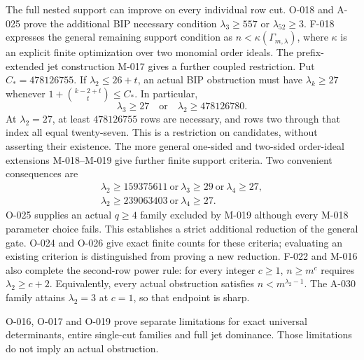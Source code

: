 \documentclass[11pt]{article}
\begin{document}
The full nested support can improve on every individual row cut.
O-018 and A-025 prove the additional BIP necessary condition
\(\lambda_3\geq557\) or \(\lambda_{52}\geq3\).
F-018 expresses the general remaining support condition as
\(n<\kappa(\Gamma_{m,\lambda})\), where \(\kappa\) is an
explicit finite optimization over two monomial order ideals.
The prefix-extended jet construction M-017 gives a further
coupled restriction. Put \(C_*=478126755\). If
\(\lambda_2\leq26+t\), an actual BIP obstruction must have
\(\lambda_k\geq27\) whenever
\(1+\binom{k-2+t}{t}\leq C_*\). In particular,
\[
 \lambda_3\geq27\quad\text{or}\quad\lambda_2\geq478126780.
\]
At \(\lambda_2=27\), at least \(478126755\) rows are
necessary, and rows two through that index all equal twenty-seven.
This is a restriction on candidates, without asserting their existence.
The more general one-sided and two-sided order-ideal extensions
M-018--M-019 give further finite support criteria. Two convenient
consequences are
\[
 \begin{gathered}
 \lambda_2\geq159375611\ \text{or}\ \lambda_3\geq29
                         \ \text{or}\ \lambda_4\geq27,\\
 \lambda_2\geq239063403\ \text{or}\ \lambda_4\geq27.
 \end{gathered}
\]
O-025 supplies an actual \(q\geq4\) family excluded by M-019
although every M-018 parameter choice fails. This establishes a
strict additional reduction of the general gate. O-024 and O-026
give exact finite counts for these criteria; evaluating an existing
criterion is distinguished from proving a new reduction.
F-022 and M-016 also complete the second-row power rule:
for every integer \(c\geq1\), \(n\geq m^c\) requires
\(\lambda_2\geq c+2\). Equivalently, every actual obstruction
satisfies \(n<m^{\lambda_2-1}\).
The A-030 family attains \(\lambda_2=3\) at \(c=1\),
so that endpoint is sharp.

O-016, O-017 and O-019 prove separate limitations for exact
universal determinants, entire single-cut families and full jet
dominance. Those limitations do not imply an actual obstruction.
\end{document}
